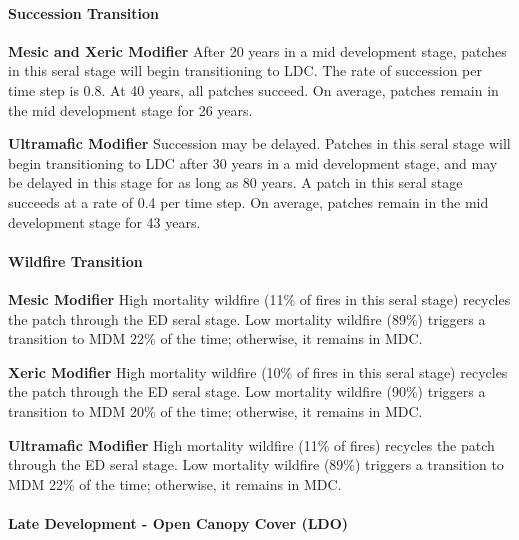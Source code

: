 \paragraph{Succession Transition}
\begin{adjustwidth}{2cm}{}
\textbf{Mesic and Xeric Modifier } After 20 years in a mid development stage, patches in this seral stage will begin transitioning to LDC. The rate of succession per time step is 0.8. At 40 years, all patches succeed. On average, patches remain in the mid development stage for 26 years.

\medskip
\noindent \textbf{Ultramafic Modifier} Succession may be delayed. Patches in this seral stage will begin transitioning to LDC after 30 years in a mid development stage, and may be delayed in this stage for as long as 80 years. A patch in this seral stage succeeds at a rate of 0.4 per time step. On average, patches remain in the mid development stage for 43 years.

\end{adjustwidth}
\paragraph{Wildfire Transition}
\begin{adjustwidth}{2cm}{}
\textbf{Mesic Modifier } High mortality wildfire (11\% of fires in this seral stage) recycles the patch through the ED seral stage. Low mortality wildfire (89\%) triggers a transition to MDM 22\% of the time; otherwise, it remains in MDC.

\medskip
\noindent \textbf{Xeric Modifier} High mortality wildfire (10\% of fires in this seral stage) recycles the patch through the ED seral stage. Low mortality wildfire (90\%) triggers a transition to MDM 20\% of the time; otherwise, it remains in MDC.

\medskip
\noindent \textbf{Ultramafic Modifier} High mortality wildfire (11\% of fires) recycles the patch through the ED seral stage. Low mortality wildfire (89\%) triggers a transition to MDM 22\% of the time; otherwise, it remains in MDC.

\end{adjustwidth}
\noindent\hrulefill


\paragraph{Late Development - Open Canopy Cover (LDO)}

